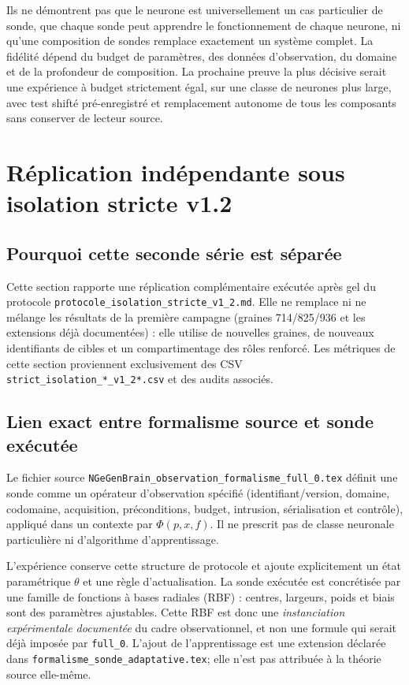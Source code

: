 \documentclass[11pt,a4paper]{article}
\begin{document}
Ils ne démontrent pas que le neurone est universellement un cas particulier de sonde, que chaque sonde peut apprendre le fonctionnement de chaque neurone, ni qu'une composition de sondes remplace exactement un système complet. La fidélité dépend du budget de paramètres, des données d'observation, du domaine et de la profondeur de composition. La prochaine preuve la plus décisive serait une expérience à budget strictement égal, sur une classe de neurones plus large, avec test shifté pré-enregistré et remplacement autonome de tous les composants sans conserver de lecteur source.

\clearpage
\section{Réplication indépendante sous isolation stricte v1.2}
\label{sec:strict-v12}

\subsection{Pourquoi cette seconde série est séparée}
Cette section rapporte une réplication complémentaire exécutée après gel du protocole \texttt{protocole\_isolation\_stricte\_v1\_2.md}. Elle ne remplace ni ne mélange les résultats de la première campagne (graines 714/825/936 et les extensions déjà documentées) : elle utilise de nouvelles graines, de nouveaux identifiants de cibles et un compartimentage des rôles renforcé. Les métriques de cette section proviennent exclusivement des CSV \texttt{strict\_isolation\_*\_v1\_2*.csv} et des audits associés.

\subsection{Lien exact entre formalisme source et sonde exécutée}
Le fichier source \texttt{NGeGenBrain\_observation\_formalisme\_full\_0.tex} définit une sonde comme un opérateur d'observation spécifié (identifiant/version, domaine, codomaine, acquisition, préconditions, budget, intrusion, sérialisation et contrôle), appliqué dans un contexte par $\Phi(p,x,f)$. Il ne prescrit pas de classe neuronale particulière ni d'algorithme d'apprentissage.

L'expérience conserve cette structure de protocole et ajoute explicitement un état paramétrique $\theta$ et une règle d'actualisation. La sonde exécutée est concrétisée par une famille de fonctions à bases radiales (RBF) : centres, largeurs, poids et biais sont des paramètres ajustables. Cette RBF est donc une \emph{instanciation expérimentale documentée} du cadre observationnel, et non une formule qui serait déjà imposée par \texttt{full\_0}. L'ajout de l'apprentissage est une extension déclarée dans \texttt{formalisme\_sonde\_adaptative.tex}; elle n'est pas attribuée à la théorie source elle-même.
\end{document}
